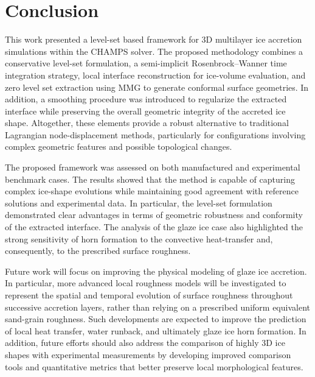 \section{Conclusion}
\label{sec:conclusionsLS}

This work presented a level-set based framework for 3D multilayer ice accretion simulations within the \textsc{CHAMPS} solver. The proposed methodology combines a conservative level-set formulation, a semi-implicit Rosenbrock--Wanner time integration strategy, local interface reconstruction for ice-volume evaluation, and zero level set extraction using \textsc{MMG} to generate conformal surface geometries. In addition, a smoothing procedure was introduced to regularize the extracted interface while preserving the overall geometric integrity of the accreted ice shape. Altogether, these elements provide a robust alternative to traditional Lagrangian node-displacement methods, particularly for configurations involving complex geometric features and possible topological changes.

The proposed framework was assessed on both manufactured and experimental benchmark cases. The results showed that the method is capable of capturing complex ice-shape evolutions while maintaining good agreement with reference solutions and experimental data. In particular, the level-set formulation demonstrated clear advantages in terms of geometric robustness and conformity of the extracted interface. The analysis of the glaze ice case also highlighted the strong sensitivity of horn formation to the convective heat-transfer and, consequently, to the prescribed surface roughness.

Future work will focus on improving the physical modeling of glaze ice accretion. In particular, more advanced local roughness models will be investigated to represent the spatial and temporal evolution of surface roughness throughout successive accretion layers, rather than relying on a prescribed uniform equivalent sand-grain roughness. Such developments are expected to improve the prediction of local heat transfer, water runback, and ultimately glaze ice horn formation. In addition, future efforts should also address the comparison of highly 3D ice shapes with experimental measurements by developing improved comparison tools and quantitative metrics that better preserve local morphological features.
